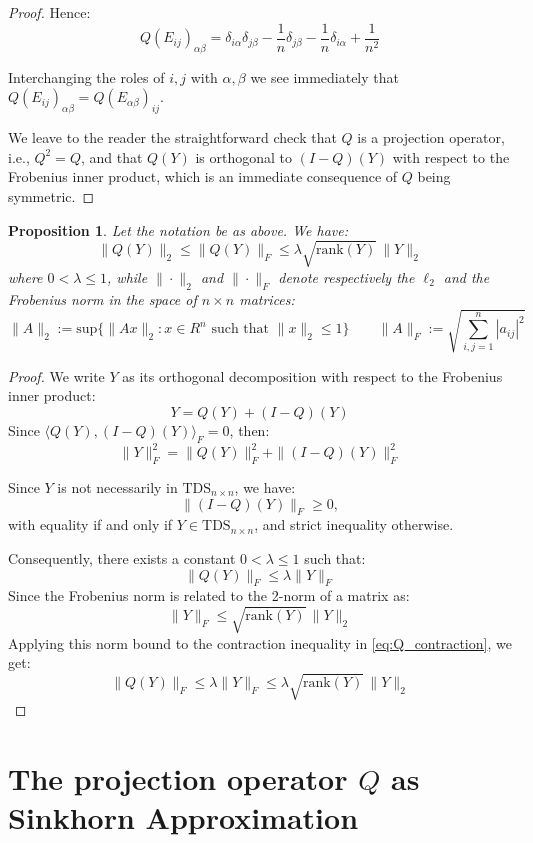 \documentclass{article}
\theoremstyle{definition}
\theoremstyle{plain}
\newtheorem{proposition}{Proposition}
\newcommand{\TDS}{\mathrm{TDS}_{n \times n}}
\newcommand{\al}{\alpha}
\newcommand{\be}{\beta}
\begin{document}
\begin{appendices}
\begin{proof}
Hence:
\[
Q(E_{ij})_{\alpha\beta}
= {\delta_{i\alpha}\delta_{j\beta}}
- \frac{1}{n} \delta_{j\beta}
- \frac{1}{n} \delta_{i\alpha}
+ \frac{1}{{n^2}}
\]

Interchanging the roles of $i,j$ with $\al,\be$ we see immediately that $Q(E_{ij})_{\al\be}=Q(E_{\al\be})_{ij}$.

We leave to the reader the straightforward check that $Q$ is a projection operator, i.e., $Q^2=Q$, and that $Q(Y)$ is orthogonal to $(I-Q)(Y)$ with respect to the Frobenius inner product, which is an immediate consequence of $Q$ being symmetric.
\end{proof}

\begin{proposition}
Let the notation be as above. We have:
\[
\|Q(Y)\|_2
\le \|Q(Y)\|_F
\le \lambda \sqrt{\mathrm{rank}(Y)}\,\|Y\|_2
\]
where $0 < \lambda \leq 1$, while $\|\cdot\|_2$ and $\|\cdot\|_F$ denote respectively the $\ell_2$
and the Frobenius norm in the space of $n\times n$ matrices:
$$
\|A\|_2:=\mathrm{sup}\{\|Ax\|_{{2}}:x\in R^{n}{\text{ such that }}\|x\|_{{2}}\leq 1\}
\qquad \|A\|_F:= \sqrt{\sum_{i,j=1}^n|a_{ij}|^2}
$$
\end{proposition}

\begin{proof}
We write $Y$ as its orthogonal decomposition with respect to the Frobenius inner product:
\[
Y = Q(Y) + (I - Q)(Y) 
\]
Since $\langle Q(Y), (I - Q)(Y) \rangle_F = 0$, then:
\[
\|Y\|_F^2 = \|Q(Y)\|_F^2 + \|(I - Q)(Y)\|_F^2
\]

Since $Y$ is not necessarily in $\TDS$, we have:
\[
\|(I-Q)(Y)\|_F \geq 0,
\]
{with equality if and only if $Y \in \TDS$, and strict inequality otherwise.}

Consequently, there exists a constant $0 < \lambda \leq 1$ such that:
\begin{equation}
\|Q(Y)\|_F \le \lambda \|Y\|_F
\label{eq:Q_contraction}
\end{equation}
Since the Frobenius norm is related to the 2-norm of a matrix as:
\[
\|Y\|_F \le \sqrt{\mathrm{rank}(Y)}\,\|Y\|_2
\]
Applying this norm bound to the contraction inequality in \ref{eq:Q_contraction}, we get:
\[
\|Q(Y)\|_F
\le \lambda \|Y\|_F
\le \lambda \sqrt{\mathrm{rank}(Y)}\,\|Y\|_2
\]
\end{proof}

\section{The projection operator $Q$ as Sinkhorn Approximation}
\label{app-qsink}


\end{appendices}
\end{document}
